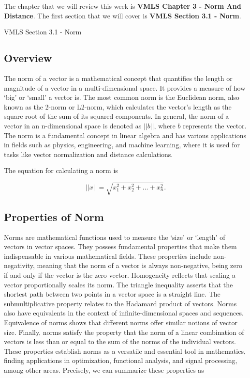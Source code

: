 The chapter that we will review this week is \textbf{VMLS Chapter 3 - Norm And Distance}. The first section that we will cover is \textbf{VMLS Section 3.1 - Norm}.

\begin{notes}{VMLS Section 3.1 - Norm}
    \subsection*{Overview}

    The norm of a vector is a mathematical concept that quantifies the length or magnitude of a vector in a multi-dimensional space. It provides a measure of how `big' or `small' a vector is. The most 
    common norm is the Euclidean norm, also known as the 2-norm or L2-norm, which calculates the vector's length as the square root of the sum of its squared components. In general, the norm of a vector 
    in an n-dimensional space is denoted as $||b||$, where $b$ represents the vector. The norm is a fundamental concept in linear algebra and has various applications in fields such as physics, 
    engineering, and machine learning, where it is used for tasks like vector normalization and distance calculations.

    \begin{highlight}
        The equation for calculating a norm is

        \begin{equation*}
            ||x|| = \sqrt{x^{2}_{1} + x^{2}_{2} + \dots + x^{2}_{n}}.
        \end{equation*}
    \end{highlight}

    \subsection*{Properties of Norm}

    Norms are mathematical functions used to measure the `size' or `length' of vectors in vector spaces. They possess fundamental properties that make them indispensable in various mathematical fields. 
    These properties include non-negativity, meaning that the norm of a vector is always non-negative, being zero if and only if the vector is the zero vector. Homogeneity reflects that scaling a vector 
    proportionally scales its norm. The triangle inequality asserts that the shortest path between two points in a vector space is a straight line. The submultiplicative property relates to the Hadamard 
    product of vectors. Norms also have equivalents in the context of infinite-dimensional spaces and sequences. Equivalence of norms shows that different norms offer similar notions of vector size. Finally, 
    norms satisfy the property that the norm of a linear combination of vectors is less than or equal to the sum of the norms of the individual vectors. These properties establish norms as a versatile and 
    essential tool in mathematics, finding applications in optimization, functional analysis, and signal processing, among other areas. Precisely, we can summarize these properties as


\end{notes}
